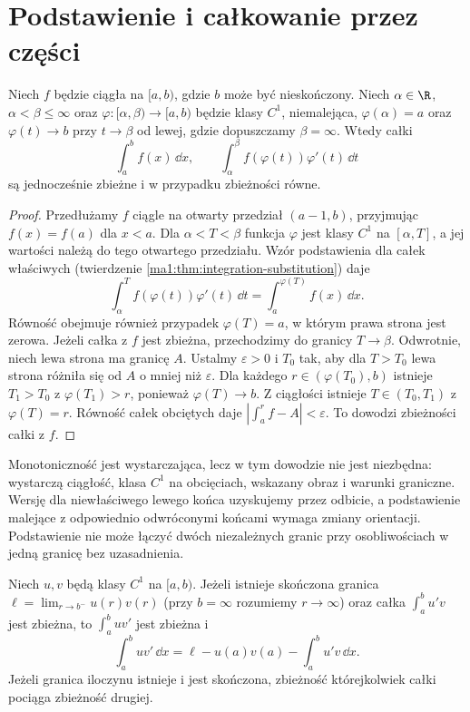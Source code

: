 \section{Podstawienie i całkowanie przez części}
\begin{twierdzenie}
\label{ma1:thm:improper-substitution}
Niech $f$ będzie ciągła na $[a,b)$, gdzie $b$ może być nieskończony. Niech $\alpha\in\R$, $\alpha<\beta\le\infty$ oraz $\varphi:[\alpha,\beta)\to[a,b)$ będzie klasy $C^1$, niemalejąca, $\varphi(\alpha)=a$ oraz $\varphi(t)\to b$ przy $t\to\beta$ od lewej, gdzie dopuszczamy $\beta=\infty$. Wtedy całki
\[
 \int_a^b f(x)\,\dd x,\qquad
 \int_\alpha^\beta f(\varphi(t))\varphi'(t)\,\dd t
\]
są jednocześnie zbieżne i w przypadku zbieżności równe.
\end{twierdzenie}
\begin{proof}
Przedłużamy $f$ ciągle na otwarty przedział $(a-1,b)$, przyjmując $f(x)=f(a)$ dla $x<a$. Dla $\alpha<T<\beta$ funkcja $\varphi$ jest klasy $C^1$ na $[\alpha,T]$, a jej wartości należą do tego otwartego przedziału. Wzór podstawienia dla całek właściwych (twierdzenie \ref{ma1:thm:integration-substitution}) daje
\[
 \int_\alpha^T f(\varphi(t))\varphi'(t)\,\dd t
 =\int_a^{\varphi(T)} f(x)\,\dd x.
\]
Równość obejmuje również przypadek $\varphi(T)=a$, w którym prawa strona jest zerowa. Jeżeli całka z $f$ jest zbieżna, przechodzimy do granicy $T\to\beta$. Odwrotnie, niech lewa strona ma granicę $A$. Ustalmy $\varepsilon>0$ i $T_0$ tak, aby dla $T>T_0$ lewa strona różniła się od $A$ o mniej niż $\varepsilon$. Dla każdego $r\in(\varphi(T_0),b)$ istnieje $T_1>T_0$ z $\varphi(T_1)>r$, ponieważ $\varphi(T)\to b$. Z ciągłości istnieje $T\in(T_0,T_1)$ z $\varphi(T)=r$. Równość całek obciętych daje $|\int_a^r f-A|<\varepsilon$. To dowodzi zbieżności całki z $f$.
\end{proof}
Monotoniczność jest wystarczająca, lecz w tym dowodzie nie jest niezbędna: wystarczą ciągłość, klasa $C^1$ na obcięciach, wskazany obraz i warunki graniczne. Wersję dla niewłaściwego lewego końca uzyskujemy przez odbicie, a podstawienie malejące z odpowiednio odwróconymi końcami wymaga zmiany orientacji. Podstawienie nie może łączyć dwóch niezależnych granic przy osobliwościach w jedną granicę bez uzasadnienia.
\begin{twierdzenie}
\label{ma1:thm:improper-parts}
Niech $u,v$ będą klasy $C^1$ na $[a,b)$. Jeżeli istnieje skończona granica $\ell=\lim_{r\to b^-}u(r)v(r)$ (przy $b=\infty$ rozumiemy $r\to\infty$) oraz całka $\int_a^b u'v$ jest zbieżna, to $\int_a^b uv'$ jest zbieżna i
\[
 \int_a^b uv'\,\dd x=\ell-u(a)v(a)-\int_a^b u'v\,\dd x.
\]
Jeżeli granica iloczynu istnieje i jest skończona, zbieżność którejkolwiek całki pociąga zbieżność drugiej.
\end{twierdzenie}
